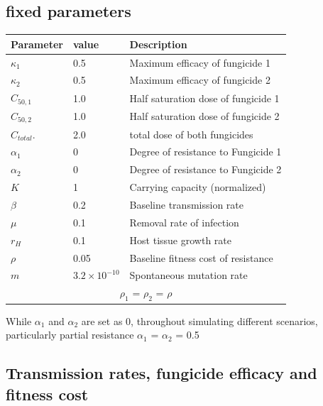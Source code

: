 \documentclass{report}
\begin{document}
\subsection{fixed parameters}
\begin{center}
    \begin{tabular}{lll}
        \toprule
        \textbf{Parameter} & \textbf{value} & \textbf{Description}\\
        \midrule
        $\kappa_1$   & 0.5                   & Maximum efficacy of fungicide 1 \\
        $\kappa_2$   & 0.5                   & Maximum efficacy of fungicide 2 \\
        $C_{50,1}$   & 1.0                   & Half saturation dose of fungicide 1 \\
        $C_{50,2}$   & 1.0                   & Half saturation dose of fungicide 2\\
        $C_{total}$. & 2.0                   & total dose of both fungicides\\
        $\alpha_{1}$     & 0                 & Degree of resistance to Fungicide 1 \\
        $\alpha_{2}$     & 0                 & Degree of resistance to Fungicide 2\\ 
        $K$          & 1                     & Carrying capacity (normalized) \\
        $\beta$      & 0.2                   & Baseline transmission rate \\
        $\mu$        & 0.1                   & Removal rate of infection \\
        $r_H$        & 0.1                   & Host tissue growth rate \\
        $\rho$     & 0.05                    & Baseline fitness cost of resistance \\
        $m$          & $3.2\times10^{-10}$   & Spontaneous mutation rate \\
        \midrule
        \multicolumn{3}{c}{$\rho_1$ = $\rho_2$ = $\rho$}\\
        \bottomrule
    \end{tabular}
\end{center}
While $\alpha_{1}$ and $\alpha_{2}$  are set as 0, throughout simulating different scenarios, particularly partial resistance $\alpha_{1}$ = $\alpha_{2}$ = 0.5

\subsection{Transmission rates, fungicide efficacy and fitness cost}
\end{document}
